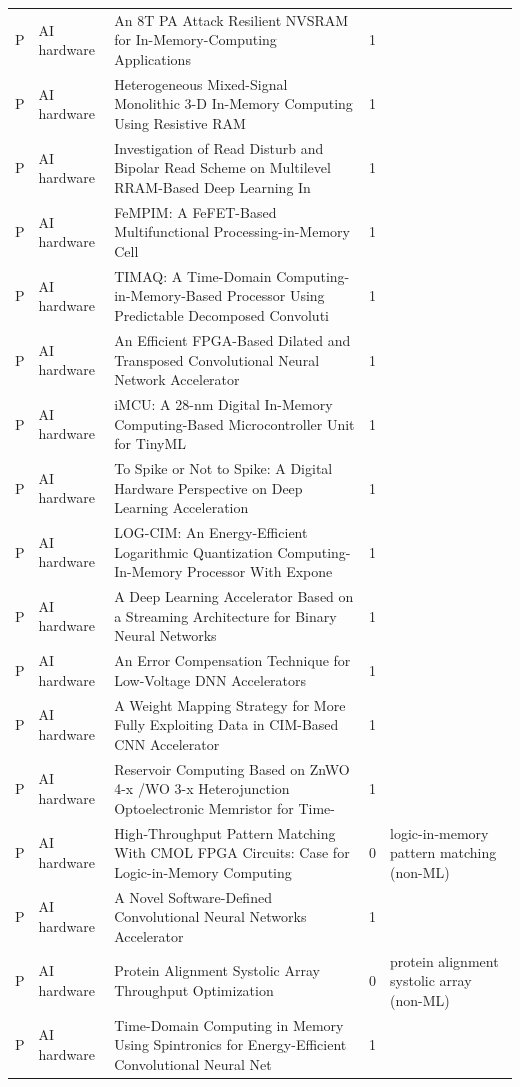 \documentclass[10pt]{article}
\begin{document}
\begin{longtable}{@{}llL{8.6cm}lL{4.2cm}@{}}
P & AI hardware & An 8T PA Attack Resilient NVSRAM for In-Memory-Computing Applications & 1 &  \\
P & AI hardware & Heterogeneous Mixed-Signal Monolithic 3-D In-Memory Computing Using Resistive RAM & 1 &  \\
P & AI hardware & Investigation of Read Disturb and Bipolar Read Scheme on Multilevel RRAM-Based Deep Learning In & 1 &  \\
P & AI hardware & FeMPIM: A FeFET-Based Multifunctional Processing-in-Memory Cell & 1 &  \\
P & AI hardware & TIMAQ: A Time-Domain Computing-in-Memory-Based Processor Using Predictable Decomposed Convoluti & 1 &  \\
P & AI hardware & An Efficient FPGA-Based Dilated and Transposed Convolutional Neural Network Accelerator & 1 &  \\
P & AI hardware & iMCU: A 28-nm Digital In-Memory Computing-Based Microcontroller Unit for TinyML & 1 &  \\
P & AI hardware & To Spike or Not to Spike: A Digital Hardware Perspective on Deep Learning Acceleration & 1 &  \\
P & AI hardware & LOG-CIM: An Energy-Efficient Logarithmic Quantization Computing-In-Memory Processor With Expone & 1 &  \\
P & AI hardware & A Deep Learning Accelerator Based on a Streaming Architecture for Binary Neural Networks & 1 &  \\
P & AI hardware & An Error Compensation Technique for Low-Voltage DNN Accelerators & 1 &  \\
P & AI hardware & A Weight Mapping Strategy for More Fully Exploiting Data in CIM-Based CNN Accelerator & 1 &  \\
P & AI hardware & Reservoir Computing Based on ZnWO 4-x /WO 3-x Heterojunction Optoelectronic Memristor for Time- & 1 &  \\
P & AI hardware & High-Throughput Pattern Matching With CMOL FPGA Circuits: Case for Logic-in-Memory Computing & 0 & logic-in-memory pattern matching (non-ML) \\
P & AI hardware & A Novel Software-Defined Convolutional Neural Networks Accelerator & 1 &  \\
P & AI hardware & Protein Alignment Systolic Array Throughput Optimization & 0 & protein alignment systolic array (non-ML) \\
P & AI hardware & Time-Domain Computing in Memory Using Spintronics for Energy-Efficient Convolutional Neural Net & 1 &  \\

\end{longtable}
\end{document}
